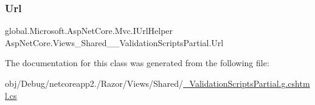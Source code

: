 \subsubsection{\texorpdfstring{Url}{Url}}
{\footnotesize\ttfamily global.\+Microsoft.\+Asp\+Net\+Core.\+Mvc.\+I\+Url\+Helper Asp\+Net\+Core.\+Views\+\_\+\+Shared\+\_\+\+\_\+\+Validation\+Scripts\+Partial.\+Url\hspace{0.3cm}{\ttfamily [get]}}



The documentation for this class was generated from the following file\+:\begin{DoxyCompactItemize}
\item 
obj/\+Debug/netcoreapp2./\+Razor/\+Views/\+Shared/\mbox{\hyperlink{___validation_scripts_partial_8g_8cshtml_8cs}{\+\_\+\+Validation\+Scripts\+Partial.\+g.\+cshtml.\+cs}}\end{DoxyCompactItemize}
